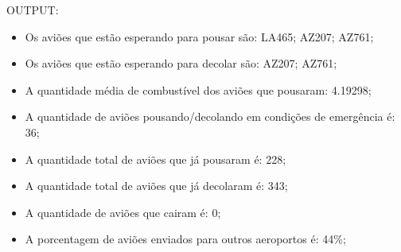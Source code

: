 \documentclass{article}
\begin{document}
OUTPUT: 
\begin{itemize}
   \item Os aviões que estão esperando para pousar são: LA465; AZ207; AZ761;
   \item Os aviões que estão esperando para decolar são: AZ207; AZ761;
   \item A quantidade média de combustível dos aviões que pousaram: 4.19298;
   \item A quantidade de aviões pousando/decolando em condições de emergência é: 36;
   \item A quantidade total de aviões que já pousaram é: 228;
   \item A quantidade total de aviões que já decolaram é: 343;
   \item A quantidade de aviões que cairam é: 0;
   \item A porcentagem de aviões enviados para outros aeroportos é: 44\%;
\end{itemize}
\end{document}
